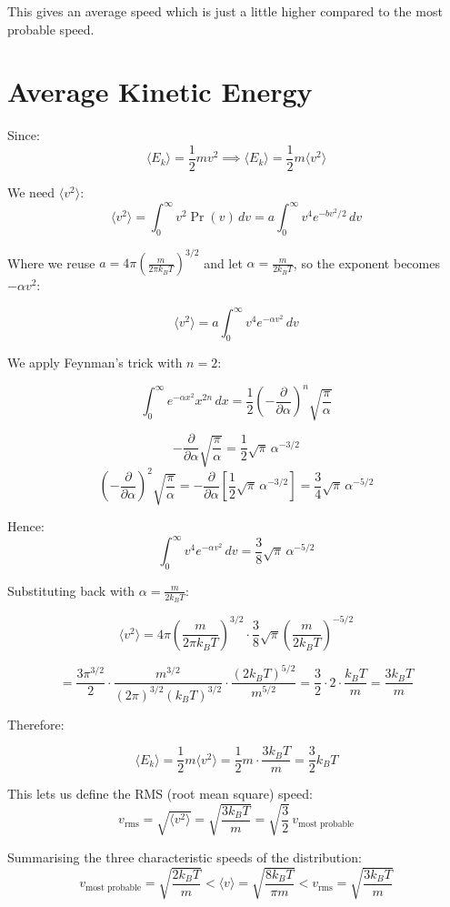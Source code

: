 This gives an average speed which is just a little higher compared to the most probable speed.

\section{Average Kinetic Energy}
Since:
\[
    \langle E_k\rangle = \frac{1}{2}mv^2 \implies \langle E_k\rangle = \frac{1}{2}m \langle v^2\rangle
\]

We need $\langle v^2 \rangle$:
\[
    \langle v^2 \rangle = \int_{0}^{\infty} v^2 \Pr(v) \, dv = a \int_{0}^{\infty} v^4 e^{-bv^2/2} \, dv
\]

Where we reuse $a = 4\pi\left(\frac{m}{2\pi k_B T}\right)^{3/2}$ and let $\alpha = \frac{m}{2k_B T}$, so the exponent becomes $-\alpha v^2$:

\[
    \langle v^2 \rangle = a \int_{0}^{\infty} v^4 e^{-\alpha v^2} \, dv
\]

We apply Feynman's trick with $n = 2$:

\[
    \int_{0}^{\infty} e^{-\alpha x^2} x^{2n} \, dx = \frac{1}{2}\left(-\frac{\partial}{\partial \alpha}\right)^n \sqrt{\frac{\pi}{\alpha}}
\]

\[
    -\frac{\partial}{\partial \alpha}\sqrt{\frac{\pi}{\alpha}} = \frac{1}{2}\sqrt{\pi}\,\alpha^{-3/2}
\]
\[
    \left(-\frac{\partial}{\partial \alpha}\right)^2\sqrt{\frac{\pi}{\alpha}} = -\frac{\partial}{\partial \alpha}\left[\frac{1}{2}\sqrt{\pi}\,\alpha^{-3/2}\right] = \frac{3}{4}\sqrt{\pi}\,\alpha^{-5/2}
\]

Hence:
\[
    \int_{0}^{\infty} v^4 e^{-\alpha v^2} \, dv = \frac{3}{8}\sqrt{\pi}\,\alpha^{-5/2}
\]

Substituting back with $\alpha = \frac{m}{2k_B T}$:

\[
    \langle v^2 \rangle = 4\pi\left(\frac{m}{2\pi k_B T}\right)^{3/2} \cdot \frac{3}{8}\sqrt{\pi} \left(\frac{m}{2k_B T}\right)^{-5/2}
\]

\[
    = \frac{3\pi^{3/2}}{2} \cdot \frac{m^{3/2}}{(2\pi)^{3/2}(k_B T)^{3/2}} \cdot \frac{(2k_B T)^{5/2}}{m^{5/2}}
    = \frac{3}{2} \cdot 2 \cdot \frac{k_B T}{m} = \frac{3k_B T}{m}
\]

Therefore:

\[
    \langle E_k \rangle = \frac{1}{2}m\langle v^2 \rangle = \frac{1}{2}m \cdot \frac{3k_B T}{m} = \boxed{\frac{3}{2}k_B T}
\]

This lets us define the RMS (root mean square) speed:
\[
    v_\text{rms} = \sqrt{\langle v^2 \rangle} = \sqrt{\frac{3k_B T}{m}} = \sqrt{\frac{3}{2}}\, v_\text{most probable}
\]

Summarising the three characteristic speeds of the distribution:
\[
    v_\text{most probable} = \sqrt{\frac{2k_B T}{m}} < \langle v \rangle = \sqrt{\frac{8k_B T}{\pi m}} < v_\text{rms} = \sqrt{\frac{3k_B T}{m}}
\]
